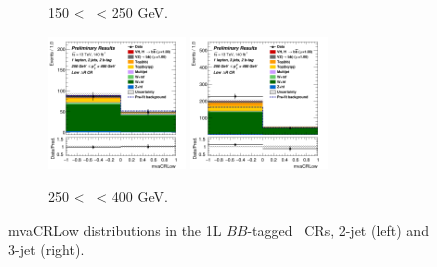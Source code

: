 \begin{figure}[h!]
\begin{subfigure}[b]{\textwidth}
        \caption{150 < \ptv\ < 250 GeV.}
        \label{fig:plots_VHbb_1L_150_CRL}
    \end{subfigure}
    \begin{subfigure}[b]{\textwidth}
        \centering
        \includegraphics[width=0.40\textwidth]{Images/VH/Own_fit/postfit_VHbb/Region_distmvaCRLow_BMax400_BMin250_DCRLow_J2_TTypebb_T2_L1_Y6051_GlobalFit_conditionnal_mu1.png}
        \includegraphics[width=0.40\textwidth]{Images/VH/Own_fit/postfit_VHbb/Region_distmvaCRLow_BMax400_BMin250_DCRLow_J3_TTypebb_T2_L1_Y6051_GlobalFit_conditionnal_mu1.png}
        \caption{250 < \ptv\ < 400 GeV.}
        \label{fig:plots_VHbb_1L_250_CRL}
    \end{subfigure}
    \caption{mvaCRLow distributions in the 1L $BB$-tagged \lowdr\ CRs, 2-jet (left) and 3-jet (right).}
    \label{fig:plots_VHbb_1L_CRL}
\end{figure} 

\vspace*{\fill} \clearpage
\vspace*{\fill}

